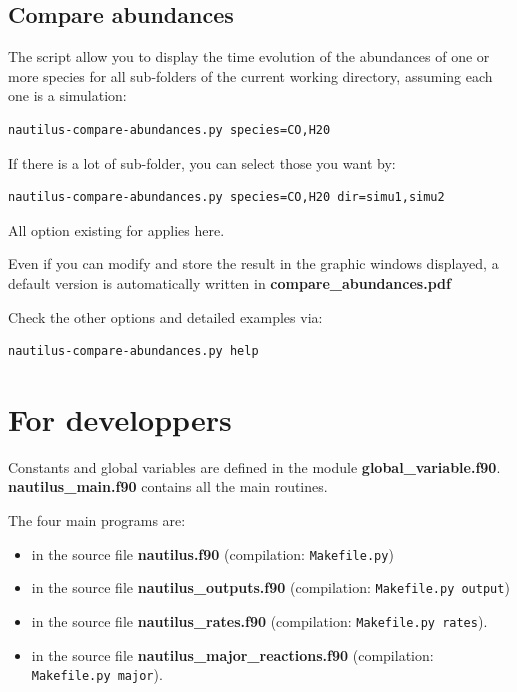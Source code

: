 \documentclass[english,a4paper,twoside]{article}
\begin{document}
\subsection{Compare abundances}
The script  allow you to display the time evolution of the abundances of one or more species for all sub-folders of the current working directory, assuming each one is a simulation:
\begin{verbatim}
nautilus-compare-abundances.py species=CO,H20
\end{verbatim}

If there is a lot of sub-folder, you can select those you want by:
\begin{verbatim}
nautilus-compare-abundances.py species=CO,H20 dir=simu1,simu2
\end{verbatim}

All option existing for  applies here.

Even if you can modify and store the result in the graphic windows displayed, a default version is automatically written in \textbf{compare\_abundances.pdf} 

Check the other options and detailed examples via:
\begin{verbatim}
nautilus-compare-abundances.py help
\end{verbatim}

\section{For developpers}\label{sec:advanced}
Constants and global variables are defined in the module \textbf{global\_variable.f90}. \textbf{nautilus\_main.f90} contains all the main routines. 

The four main programs are:
\begin{itemize}
\item {} in the source file \textbf{nautilus.f90} (compilation:  \verb|Makefile.py|)
\item {} in the source file \textbf{nautilus\_outputs.f90} (compilation: \verb|Makefile.py output|)
\item {} in the source file \textbf{nautilus\_rates.f90} (compilation: \verb|Makefile.py rates|).
\item {} in the source file \textbf{nautilus\_major\_reactions.f90} (compilation: \\ \verb|Makefile.py major|).
\end{itemize}
\end{document}
